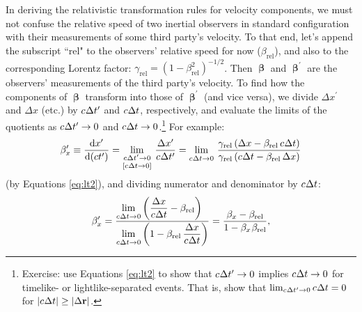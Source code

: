\documentclass[12pt]{article}
\renewcommand{\vv}[1]{\mathbf{#1}}
\newcommand{\dd}[1]{\mathrm{d}#1}
\newcommand{\vvbeta}{\bm{\upbeta}}
\begin{document}
In deriving the relativistic transformation rules for velocity components, we must not confuse the relative speed of two inertial observers in standard configuration with their measurements of some third party's velocity. To that end, let's append the subscript ``rel" to the observers' relative speed for now ($\beta_{\textrm{rel}}$), and also to the corresponding Lorentz factor: $\gamma_{\textrm{rel}} = (1 - \beta_{\textrm{rel}}^2)^{-1/2}$. Then $\vvbeta$ and $\vvbeta^{\prime}$ are the observers' measurements of the third party's velocity. To find how the components of $\vvbeta$ transform into those of $\vvbeta^{\prime}$ (and vice versa), we divide $\Delta x^\prime$ and $\Delta x$ (etc.) by $c \mkern.5mu \Delta t^\prime$ and $c \mkern.5mu \Delta t$, respectively, and evaluate the limits of the quotients as $c \mkern.5mu \Delta t^\prime \rightarrow 0$ and $c \mkern.5mu \Delta t \rightarrow 0$.\footnote{Exercise: use Equations \ref{eq:lt2} to show that $c \mkern.5mu \Delta t^\prime \rightarrow 0$ implies $c \mkern.5mu \Delta t \rightarrow 0$ for timelike- or lightlike-separated events. That is, show that $\lim_{c \mkern.5mu \Delta t^\prime \to 0} c \mkern.5mu \Delta t = 0$ for $\vert c \mkern.5mu \Delta t \vert \geq \vert \Delta \vv r \vert$.} For example:
\begin{equation*}
\beta_x^\prime \equiv \dfrac{\dd x^\prime}{\dd (ct^\prime)} = \lim_{\substack{c \mkern.5mu \Delta t^\prime \to 0 \\[1.5pt] [c \mkern.5mu \Delta t \to 0]}} \, \frac{\Delta x^\prime}{c \mkern.5mu \Delta t^\prime} = \lim_{\substack{\\ c \mkern.5mu \Delta t \to 0}} \, \frac{\gamma_{\textrm{rel}} \left( \Delta x - \beta_{\textrm{rel}} \, c \mkern.5mu \Delta t \right)}{\gamma_{\textrm{rel}} \left( c \mkern.5mu \Delta t - \beta_{\textrm{rel}} \, \Delta x \right)}
\end{equation*}
(by Equations \ref{eq:lt2}), and dividing numerator and denominator by $c \mkern.5mu \Delta t$:
\begin{equation*}
\beta_x^\prime = \frac{\lim\limits_{\substack{\\ c \mkern.5mu \Delta t \to 0}} \left( \dfrac{\Delta x}{c \mkern.5mu \Delta t} - \beta_{\textrm{rel}} \right) \hfill}{\lim\limits_{\substack{\\ c \mkern.5mu \Delta t \to 0}} \left( 1 - \beta_{\textrm{rel}} \, \dfrac{\Delta x}{c \mkern.5mu \Delta t} \right) } = \frac{\beta_x - \beta_{\textrm{rel}}}{1 - \beta_{x} \mkern1mu \beta_{\textrm{rel}}},
\end{equation*}
\end{document}
